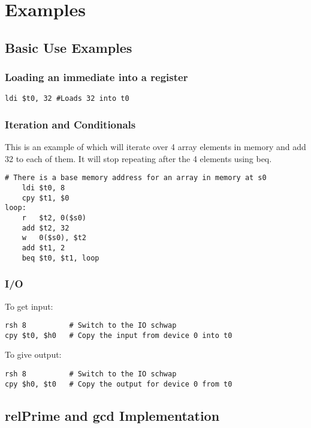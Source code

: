 \documentclass{article}
\begin{document}
\section{Examples}
	\lstset{language=sh}
	\subsection{Basic Use Examples}
		\subsubsection{Loading an immediate into a register}
			\begin{lstlisting}[frame=single]
ldi $t0, 32	#Loads 32 into t0
			\end{lstlisting}
		\subsubsection{Iteration and Conditionals}
			This is an example of which will iterate over 4 array elements in memory and add 32 to each of them.  It will stop repeating after the 4 elements using beq.
			\begin{lstlisting}[frame=single]
	# There is a base memory address for an array in memory at s0
	ldi $t0, 8
	cpy $t1, $0
loop:
	r   $t2, 0($s0)
	add $t2, 32
	w   0($s0), $t2
	add $t1, 2
	beq $t0, $t1, loop
			\end{lstlisting}
		\subsubsection{I/O}
			To get input:
			\begin{lstlisting}[frame=single]
rsh 8          # Switch to the IO schwap
cpy $t0, $h0   # Copy the input from device 0 into t0
			\end{lstlisting}
			To give output:
			\begin{lstlisting}[frame=single]
rsh 8          # Switch to the IO schwap
cpy $h0, $t0   # Copy the output for device 0 from t0
			\end{lstlisting}
	\subsection{relPrime and gcd Implementation}
\end{document}
